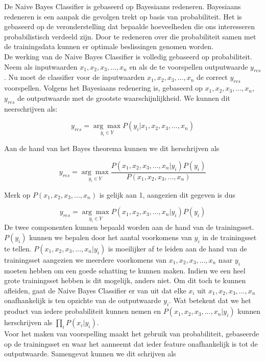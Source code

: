 De Naive Bayes Classifier is gebaseerd op Bayesiaans redeneren. Bayesiaans redeneren is een aanpak die gevolgen trekt op basis van probabiliteit. Het is gebaseerd op de veronderstelling dat bepaalde hoeveelheden die ons interesseren probabilistisch verdeeld zijn. Door te redeneren over die probabiliteit samen met de trainingsdata kunnen er optimale beslissingen genomen worden.\\%

%
De werking van de Naive Bayes Classifier is volledig gebaseerd op probabiliteit. Neem als inputwaarden $x_{1} , x_{2}, x_{3}, ..., x_{n}$ en als de te voorspellen outputwaarde $y_{res}$. Nu moet de classifier voor de inputwaarden $x_{1} , x_{2}, x_{3}, ..., x_{n}$ de correct $y_{res}$ voorspellen. Volgens het Bayesiaans redenering is, gebaseerd op $x_{1} , x_{2}, x_{3}, ..., x_{n}$,  $y_{res}$ de outputwaarde met de grootste waarschijnlijkheid. We kunnen dit neerschrijven als:

\[y_{res} = \underset{y_i \in Y}{\arg\max}P(y_i|x_{1},x_{2},x_{3},...,x_{n}) \] 

Aan de hand van het Bayes theorema kunnen we dit herschrijven als

\[ y_{res} = \underset{y_i \in Y}{\arg\max}\frac{P(x_{1},x_{2},x_{3},...,x_{n}|y_i)P(y_i)}{P(x_{1},x_{2}, x_{3},...,x_{n})} \]

 Merk op $P(x_{1},x_{2},x_{3},...,x_{n})$ is gelijk aan 1, aangezien dit gegeven is dus

 \[ y_{res} = \underset{y_i \in Y}{\arg\max}P(x_{1},x_{2},x_{3},...,x_{n}|y_i)P(y_i) \]
%
 De twee componenten kunnen bepaald worden aan de hand van de trainingsset. $P(y_i)$ kunnen we bepalen door het aantal voorkomens van $y_i$ in de trainingsset te tellen. $P(x_{1},x_{2},x_{3},...,x_{n}|y_i)$ is moeilijker af te leiden aan de hand van de trainingsset aangezien we meerdere voorkomens van $x_{1},x_{2},x_{3},...,x_{n}$ naar $y_i$ moeten hebben om een goede schatting te kunnen maken.  Indien we een heel grote trainingsset hebben is dit mogelijk, anders niet. Om dit toch te kunnen afleiden, gaat de Naive Bayes Classifier er van uit dat elke $x_i$ uit $x_{1},x_{2},x_{3},...,x_{n}$ onafhankelijk is ten opzichte van de outputwaarde $y_i$. Wat betekent dat we het product van iedere probabiliteit kunnen nemen en $P(x_{1},x_{2},x_{3},...,x_{n}|y_i)$  kunnen herschrijven als $\prod\limits_{i} P(x_{i}|y_{i})$.\\
%
Voor het maken van voorspelling maakt het gebruik van probabiliteit, gebaseerde op de trainingsset en waar het aanneemt dat ieder feature onafhankelijk is tot de outputwaarde. Samengevat kunnen we dit schrijven als

